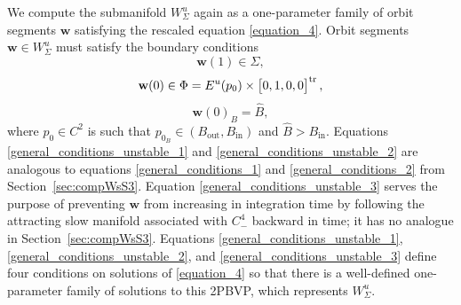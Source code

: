 \documentclass{ws-ijbc}
\begin{document}
We compute the submanifold $W^u_\Sigma$ again as a one-parameter family of orbit segments $\mathbf{w}$ satisfying the rescaled equation \eqref{equation_4}.  Orbit segments $\mathbf{w} \in W^u_\Sigma$ must satisfy the boundary conditions
%
\begin{equation}
	\mathbf{w}(1) \in \Sigma,
	\label{general_conditions_unstable_1}
\end{equation}
%
\begin{equation}
	\mathbf{w}(0) \in \Phi = E^u(p_0) \times \begin{bmatrix} 0, 1, 0, 0 \end{bmatrix}^{\rm tr},
\label{general_conditions_unstable_2}
\end{equation}
%
\begin{equation}
	\mathbf{w}(0)_B = \widehat{B},
	\label{general_conditions_unstable_3}
\end{equation}
%
where $p_0 \in C^2$ is such that $p_{0_B} \in (B_{\text{out}}, B_{\text{in}})$ and $\widehat{B}>B_{\text{in}}$.  Equations \eqref{general_conditions_unstable_1} and \eqref{general_conditions_unstable_2} are analogous to equations \eqref{general_conditions_1} and \eqref{general_conditions_2} from Section~\ref{sec:compWsS3}.  Equation \eqref{general_conditions_unstable_3} serves the purpose of preventing $\mathbf{w}$ from increasing in integration time by following the attracting slow manifold associated with $C^4_-$ backward in time; it has no analogue in Section~\ref{sec:compWsS3}. Equations \eqref{general_conditions_unstable_1}, \eqref{general_conditions_unstable_2}, and \eqref{general_conditions_unstable_3} define four conditions on solutions of \eqref{equation_4} so that there is a well-defined one-parameter family of solutions to this 2PBVP, which represents $W^u_\Sigma$.
\end{document}
